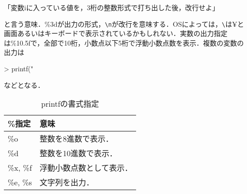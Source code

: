 「変数iに入っている値を，3桁の整数形式で打ち出した後，改行せよ」

と言う意味．\%3dが出力の形式，\verb|\n|が改行を意味する．OSによっては，\verb|\|は¥と画面あるいはキーボードで表示されているかもしれない．実数の出力指定は\%10.5fで，全部で10桁，小数点以下5桁で浮動小数点数を表示．複数の変数の出力は
\begin{MapleInput}
> printf("%
\end{MapleInput}
などとなる．

\begin{table}[htbp]
\caption{printfの書式指定}
\begin{center}
\begin{tabular}{|l|l|}
\hline
\%指定 & 意味\\ \hline
\%o & 整数を8進数で表示．\\
\%d & 整数を10進数で表示．\\
\%x,%
\%f & 浮動小数点数として表示．\\
\%e,%
\%s & 文字列を出力．\\ 
\hline
\end{tabular}
\end{center}
\label{default}
\end{table}%

